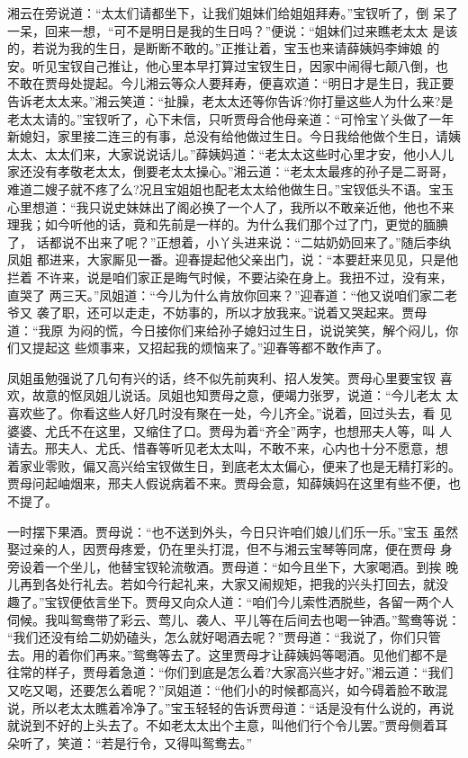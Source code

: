 湘云在旁说道：“太太们请都坐下，让我们姐妹们给姐姐拜寿。”宝钗听了，倒
呆了一呆，回来一想，“可不是明日是我的生日吗？”便说：“姐妹们过来瞧老太太
是该的，若说为我的生日，是断断不敢的。”正推让着，宝玉也来请薛姨妈李婶娘
的安。听见宝钗自己推让，他心里本早打算过宝钗生日，因家中闹得七颠八倒，也
不敢在贾母处提起。今儿湘云等众人要拜寿，便喜欢道：“明日才是生日，我正要
告诉老太太来。”湘云笑道：“扯臊，老太太还等你告诉?你打量这些人为什么来?是
老太太请的。”宝钗听了，心下未信，只听贾母合他母亲道：“可怜宝丫头做了一年
新媳妇，家里接二连三的有事，总没有给他做过生日。今日我给他做个生日，请姨
太太、太太们来，大家说说话儿。”薛姨妈道：“老太太这些时心里才安，他小人儿
家还没有孝敬老太太，倒要老太太操心。”湘云道：“老太太最疼的孙子是二哥哥，
难道二嫂子就不疼了么?况且宝姐姐也配老太太给他做生日。”宝钗低头不语。宝玉
心里想道：“我只说史妹妹出了阁必换了一个人了，我所以不敢亲近他，他也不来
理我；如今听他的话，竟和先前是一样的。为什么我们那个过了门，更觉的腼腆了，
话都说不出来了呢？”正想着，小丫头进来说：“二姑奶奶回来了。”随后李纨凤姐
都进来，大家厮见一番。迎春提起他父亲出门，说：“本要赶来见见，只是他拦着
不许来，说是咱们家正是晦气时候，不要沾染在身上。我扭不过，没有来，直哭了
两三天。”凤姐道：“今儿为什么肯放你回来？”迎春道：“他又说咱们家二老爷又
袭了职，还可以走走，不妨事的，所以才放我来。”说着又哭起来。贾母道：“我原
为闷的慌，今日接你们来给孙子媳妇过生日，说说笑笑，解个闷儿，你们又提起这
些烦事来，又招起我的烦恼来了。”迎春等都不敢作声了。

凤姐虽勉强说了几句有兴的话，终不似先前爽利、招人发笑。贾母心里要宝钗
喜欢，故意的怄凤姐儿说话。凤姐也知贾母之意，便竭力张罗，说道：“今儿老太
太喜欢些了。你看这些人好几时没有聚在一处，今儿齐全。”说着，回过头去，看
见婆婆、尤氏不在这里，又缩住了口。贾母为着“齐全”两字，也想邢夫人等，叫
人请去。邢夫人、尤氏、惜春等听见老太太叫，不敢不来，心内也十分不愿意，想
着家业零败，偏又高兴给宝钗做生日，到底老太太偏心，便来了也是无精打彩的。
贾母问起岫烟来，邢夫人假说病着不来。贾母会意，知薛姨妈在这里有些不便，也
不提了。

一时摆下果酒。贾母说：“也不送到外头，今日只许咱们娘儿们乐一乐。”宝玉
虽然娶过亲的人，因贾母疼爱，仍在里头打混，但不与湘云宝琴等同席，便在贾母
身旁设着一个坐儿，他替宝钗轮流敬酒。贾母道：“如今且坐下，大家喝酒。到挨
晚儿再到各处行礼去。若如今行起礼来，大家又闹规矩，把我的兴头打回去，就没
趣了。”宝钗便依言坐下。贾母又向众人道：“咱们今儿索性洒脱些，各留一两个人
伺候。我叫鸳鸯带了彩云、莺儿、袭人、平儿等在后间去也喝一钟酒。”鸳鸯等说：
“我们还没有给二奶奶磕头，怎么就好喝酒去呢？”贾母道：“我说了，你们只管
去。用的着你们再来。”鸳鸯等去了。这里贾母才让薛姨妈等喝酒。见他们都不是
往常的样子，贾母着急道：“你们到底是怎么着?大家高兴些才好。”湘云道：“我们
又吃又喝，还要怎么着呢？”凤姐道：“他们小的时候都高兴，如今碍着脸不敢混
说，所以老太太瞧着冷净了。”宝玉轻轻的告诉贾母道：“话是没有什么说的，再说
就说到不好的上头去了。不如老太太出个主意，叫他们行个令儿罢。”贾母侧着耳
朵听了，笑道：“若是行令，又得叫鸳鸯去。”

